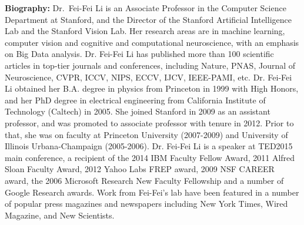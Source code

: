 \vfill
\noindent

{\bfseries Biography:} 
Dr.\ Fei-Fei Li is an Associate Professor in the Computer Science
Department at Stanford, and the Director of the Stanford Artificial
Intelligence Lab and the Stanford Vision Lab. Her research areas are
in machine learning, computer vision and cognitive and computational
neuroscience, with an emphasis on Big Data analysis. Dr. Fei-Fei Li
has published more than 100 scientific articles in top-tier journals
and conferences, including Nature, PNAS, Journal of Neuroscience,
CVPR, ICCV, NIPS, ECCV, IJCV, IEEE-PAMI, etc. Dr. Fei-Fei Li obtained
her B.A. degree in physics from Princeton in 1999 with High Honors,
and her PhD degree in electrical engineering from California Institute
of Technology (Caltech) in 2005. She joined Stanford in 2009 as an
assistant professor, and was promoted to associate professor with
tenure in 2012. Prior to that, she was on faculty at Princeton
University (2007-2009) and University of Illinois Urbana-Champaign
(2005-2006). Dr. Fei-Fei Li is a speaker at TED2015 main conference, a
recipient of the 2014 IBM Faculty Fellow Award, 2011 Alfred Sloan
Faculty Award, 2012 Yahoo Labs FREP award, 2009 NSF CAREER award, the
2006 Microsoft Research New Faculty Fellowship and a number of Google
Research awards. Work from Fei-Fei’s lab have been featured in a
number of popular press magazines and newspapers including New York
Times, Wired Magazine, and New Scientists.

\newpage
